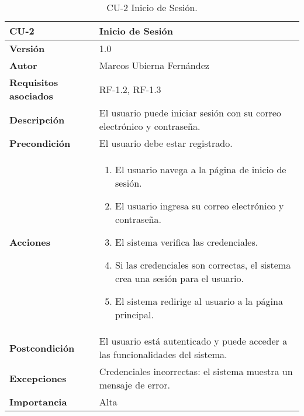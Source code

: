 \begin{table}[p]
	\centering
	\begin{tabularx}{\linewidth}{ p{} p{} }
		\toprule
		\textbf{CU-2}    & \textbf{Inicio de Sesión}\\
		\toprule
		\textbf{Versión}              & 1.0    \\
		\textbf{Autor}                & Marcos Ubierna Fernández \\
		\textbf{Requisitos asociados} & RF-1.2, RF-1.3 \\
		\textbf{Descripción}          & El usuario puede iniciar sesión con su correo electrónico y contraseña. \\
		\textbf{Precondición}         & El usuario debe estar registrado. \\
		\textbf{Acciones}             &
		\begin{enumerate}
			\def\labelenumi{\arabic{enumi}.}
			\tightlist
		      \item El usuario navega a la página de inicio de sesión.
		      \item El usuario ingresa su correo electrónico y contraseña.
                \item El sistema verifica las credenciales.
                \item Si las credenciales son correctas, el sistema crea una sesión para el usuario.
                \item El sistema redirige al usuario a la página principal.
		\end{enumerate}\\
		\textbf{Postcondición}        & El usuario está autenticado y puede acceder a las funcionalidades del sistema. \\
		\textbf{Excepciones}          & Credenciales incorrectas: el sistema muestra un mensaje de error. \\
		\textbf{Importancia}          & Alta \\
		\bottomrule
	\end{tabularx}
	\caption{CU-2 Inicio de Sesión.}
\end{table}

